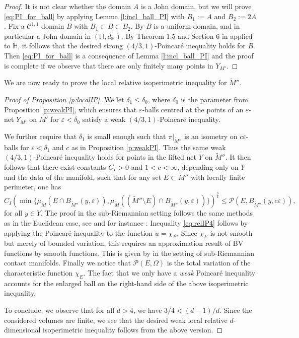 \documentclass[10pt,letterpaper]{amsart}
\theoremstyle{definition}
\numberwithin{thm}{subsection}
\numberwithin{equation}{section}
\begin{document}
\begin{proof}
It is not clear whether the domain $A$ is a John domain, but we will prove \eqref{eq:PI_for_ball} by applying Lemma \ref{l:incl_ball_PI} with $B_1:=A$ and $B_2:=2A$. Fix a ${\mathcal C}^{1,1}$ domain $B$ with $B_1 \subset B \subset B_2$. By \cite[Theorem 1.3]{MR2135732} $B$ is a uniform domain, and in particular a John domain in $({\mathbb H},d_{\mathbb H})$. By Theorem 1.5 and Section 6 in \cite{MR1404326} applied to ${\mathbb H}$, it follows that the desired strong $(4/3,1)$-Poincar\'{e} inequality holds for $B$. Then \eqref{eq:PI_for_ball} is a consequence of Lemma \ref{l:incl_ball_PI} and the proof is complete if we observe that there are only finitely many points in $Y_{M'}$.
\end{proof}

We are now ready to prove the local relative isoperimetric inequality for $\widetilde{M}''$.

\begin{proof}[Proof of Proposition \ref{p:localIP}]
We let $\delta_1 \leq \delta_0$, where $\delta_0$ is the parameter from Proposition \ref{p:weakPI}, which ensures that $\varepsilon$-balls centred at the points of an $\varepsilon$-net $Y_{M'}$ on $M'$ for $\varepsilon<\delta_0$ satisfy a weak $(4/3,1)$-Poincar\'{e} inequality.

We further require that $\delta_1$ is small enough such that $\pi|_{\widetilde{M}''}$ is an isometry on $c\varepsilon$-balls for $\varepsilon < \delta_1$ and $c$ as in Proposition \ref{p:weakPI}. Thus the same weak $(4/3,1)$-Poincar\'{e} inequality holds for points in the lifted net $Y$ on $\widetilde{M}''$. It then follows that there exist constants $C_I>0$ and $1<c<\infty$, depending only on $Y$ and the data of the manifold, such that for any set $E\subset \widetilde{M}''$ with locally finite perimeter,
one has
\begin{equation}\label{eq:relIP4}
C_I \left(\min \{\mu_{\widetilde{M}}(E\cap B_{\widetilde{M}''}(y,\varepsilon)),\mu_{\widetilde{M}}((\widetilde{M}''\setminus E) \cap B_{\widetilde{M}''}(y,\varepsilon))\}\right)^{\frac{3}{4}}\leq \mathcal{P}(E,B_{\widetilde{M}''}(y,c\varepsilon)),
\end{equation}
for all $y \in Y$. The proof in the sub-Riemannian setting follows the same methods as in the Euclidean case, see \cite{MR2979606} and for instance \cite[Corollary 1.29]{MR775682}: Inequality \eqref{eq:relIP4} follows by applying the Poincar\'{e} inequality to the function $u=\chi_E$. Since $\chi_E$ is not smooth but merely of bounded variation, this requires an approximation result of BV functions by smooth functions. This is given by \cite[Proposition 2.4]{MR2979606} in the setting of sub-Riemannian contact manifolds. Finally we notice that $\mathcal{P}(E,\Omega)$ is the total variation of the characteristic function $\chi_E$. The fact that we only have a \emph{weak} Poincar\'{e} inequality accounts for the enlarged ball on the right-hand side of the above isoperimetric inequality.

To conclude, we observe that for all $d>4$, we have $3/4< (d-1)/d$. Since the considered volumes are finite, we see that the desired weak local relative $d$-dimensional isoperimetric inequality follows from the above version.
\end{proof}
\end{document}
